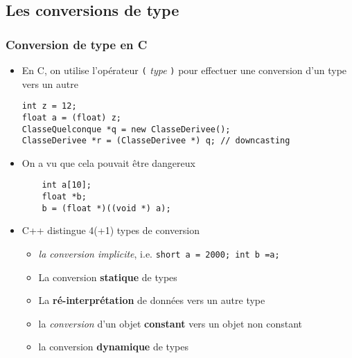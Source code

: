 


\subsection{Les conversions de type}

\begin{frame}[fragile]\frametitle{Conversion de type en C}
\begin{itemize}
\item En C, on utilise l'opérateur \texttt{(} \textit{type} \texttt{)} pour effectuer une conversion d'un type vers un autre
\begin{lstlisting}
int z = 12;
float a = (float) z;
ClasseQuelconque *q = new ClasseDerivee();
ClasseDerivee *r = (ClasseDerivee *) q; // downcasting
\end{lstlisting}
\item On a vu que cela pouvait être dangereux
\begin{lstlisting}
    int a[10];
    float *b;
    b = (float *)((void *) a);
\end{lstlisting}
\item C++ distingue 4(+1) types de conversion
\begin{itemize}
\item \textit{la conversion implicite}, i.e. \verb|short a = 2000; int b =a;|
\item La conversion \textbf{statique} de types
\item La \textbf{ré-interprétation} de données vers un autre type
\item la \textit{conversion} d'un objet \textbf{constant} vers un objet non constant
\item la conversion \textbf{dynamique} de types
\end{itemize}
\end{itemize}
\end{frame}


